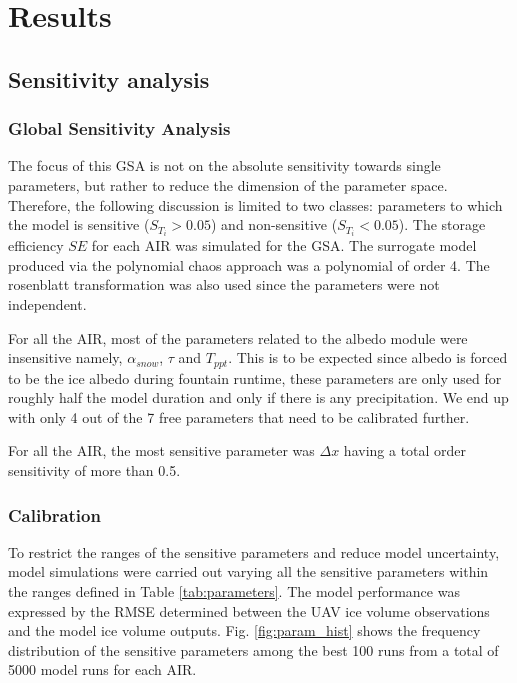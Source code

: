 \documentclass[utf8]{frontiersSCNS} %
\begin{document}
\section{Results}

\subsection{Sensitivity analysis}

\subsubsection{Global Sensitivity Analysis}

The focus of this GSA is not on the absolute sensitivity towards single parameters, but rather to reduce the dimension
of the parameter space. Therefore, the following discussion is limited to two classes: parameters to which the model is
sensitive ($S_{T_{i}} > 0.05$) and non-sensitive ($S_{T_{i}} < 0.05$). The storage efficiency $SE$ for each AIR was
simulated for the GSA. The surrogate model produced via the polynomial chaos approach was a polynomial of order 4. The
rosenblatt transformation was also used since the parameters were not independent.

For all the AIR, most of the parameters related to the albedo module were insensitive namely, $\alpha_{snow}$, $\tau$ and
$T_{ppt}$. This is to be expected since albedo is forced to be the ice albedo during fountain runtime, these
parameters are only used for roughly half the model duration and only if there is any precipitation. We end
up with only 4 out of the 7 free parameters that need to be calibrated further.

For all the AIR, the most sensitive parameter was $\Delta x$ having a total order sensitivity of more than 0.5.

\subsubsection{Calibration}

To restrict the ranges of the sensitive parameters and reduce model uncertainty, model simulations were carried out
varying all the sensitive parameters within the ranges defined in Table \ref{tab:parameters}. The model performance was
expressed by the RMSE determined between the UAV ice volume observations and the model ice volume outputs. Fig.
\ref{fig:param_hist} shows the frequency distribution of the sensitive parameters among the best 100 runs from a total
of 5000 model runs for each AIR.
\end{document}

